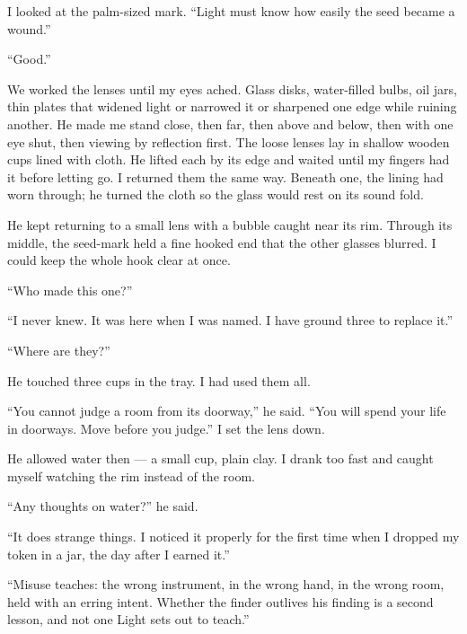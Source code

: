 I looked at the palm-sized mark. ``Light must know how easily the seed became a wound.''\par

``Good.''\par

We worked the lenses until my eyes ached. Glass disks, water-filled bulbs, oil jars, thin plates that widened light or narrowed it or sharpened one edge while ruining another. He made me stand close, then far, then above and below, then with one eye shut, then viewing by reflection first. The loose lenses lay in shallow wooden cups lined with cloth. He lifted each by its edge and waited until my fingers had it before letting go. I returned them the same way. Beneath one, the lining had worn through; he turned the cloth so the glass would rest on its sound fold.\par

He kept returning to a small lens with a bubble caught near its rim. Through its middle, the seed-mark held a fine hooked end that the other glasses blurred. I could keep the whole hook clear at once.\par

``Who made this one?''\par
``I never knew. It was here when I was named. I have ground three to replace it.''\par
``Where are they?''\par
He touched three cups in the tray. I had used them all.\par

``You cannot judge a room from its doorway,'' he said. ``You will spend your life in doorways. Move before you judge.'' I set the lens down.\par

He allowed water then --- a small cup, plain clay. I drank too fast and caught myself watching the rim instead of the room.\par

``Any thoughts on water?'' he said.\par

``It does strange things. I noticed it properly for the first time when I dropped my token in a jar, the day after I earned it.''\par

``Misuse teaches: the wrong instrument, in the wrong hand, in the wrong room, held with an erring intent. Whether the finder outlives his finding is a second lesson, and not one Light sets out to teach.''\par


